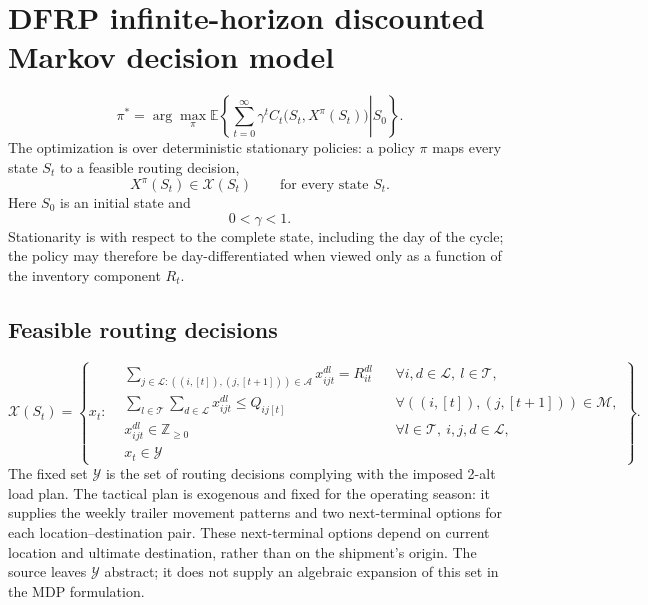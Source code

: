 \documentclass{article}
\begin{document}
\section*{DFRP infinite-horizon discounted Markov decision model}

\[
\pi^*=\arg\max_{\pi}\mathbb{E}\left\{\left.
\sum_{t=0}^{\infty}\gamma^t C_t\bigl(S_t,X^\pi(S_t)\bigr)
\right|S_0\right\}.
\]
The optimization is over deterministic stationary policies: a policy $\pi$ maps every state $S_t$ to a feasible routing decision,
\[
X^\pi(S_t)\in\mathcal{X}(S_t)\qquad\text{for every state }S_t.
\]
Here $S_0$ is an initial state and
\[
0<\gamma<1.
\]
Stationarity is with respect to the complete state, including the day of the cycle; the policy may therefore be day-differentiated when viewed only as a function of the inventory component $R_t$.

\subsection*{Feasible routing decisions}
\begin{equation}
\mathcal{X}(S_t)=\left\{x_t:\begin{aligned}
&\sum_{j\in\mathcal{L}:((i,[t]),(j,[t+1]))\in\mathcal{A}}x_{ijt}^{dl}=R_{it}^{dl}
&&\forall i,d\in\mathcal{L},\ l\in\mathcal{T},\\
&\sum_{l\in\mathcal{T}}\sum_{d\in\mathcal{L}}x_{ijt}^{dl}\leq Q_{ij[t]}
&&\forall ((i,[t]),(j,[t+1]))\in\mathcal{M},\\
&x_{ijt}^{dl}\in\mathbb{Z}_{\geq0}
&&\forall l\in\mathcal{T},\ i,j,d\in\mathcal{L},\\
&x_t\in\mathcal{Y}
\end{aligned}\right\}.
\tag{1}
\end{equation}
The fixed set $\mathcal{Y}$ is the set of routing decisions complying with the imposed 2-alt load plan. The tactical plan is exogenous and fixed for the operating season: it supplies the weekly trailer movement patterns and two next-terminal options for each location--destination pair. These next-terminal options depend on current location and ultimate destination, rather than on the shipment's origin. The source leaves $\mathcal{Y}$ abstract; it does not supply an algebraic expansion of this set in the MDP formulation.
\end{document}
